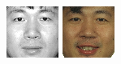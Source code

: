 \begin{figure}
\begin{center}
{\includegraphics[width=\columnwidth/12]{ch5/figures/00029_930831_fb.png}
\includegraphics[width=\columnwidth/12]{ch5/figures/00029_940128_fb.png}
}
\end{center}
\end{figure}
